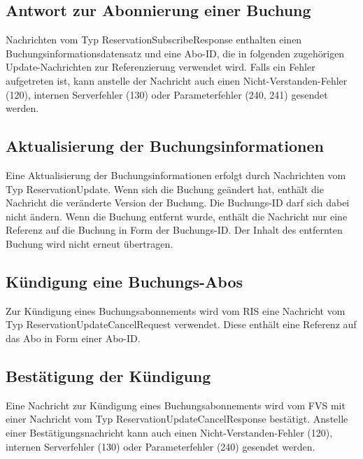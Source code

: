 

\subsection{Antwort zur Abonnierung einer Buchung}
Nachrichten vom Typ ReservationSubscribeResponse enthalten einen Buchungsinformationsdatensatz und eine Abo-ID, die in folgenden zugehörigen Update-Nachrichten zur Referenzierung verwendet wird. Falls ein Fehler aufgetreten ist, kann anstelle der Nachricht auch einen Nicht-Verstanden-Fehler (120), internen Serverfehler (130) oder Parameterfehler (240, 241) gesendet werden.



\subsection{Aktualisierung der Buchungsinformationen}
Eine Aktualisierung der Buchungsinformationen erfolgt durch Nachrichten vom Typ ReservationUpdate. Wenn sich die Buchung geändert hat, enthält die Nachricht die veränderte Version der Buchung. Die Buchungs-ID darf sich dabei nicht ändern. Wenn die Buchung entfernt wurde, enthält die Nachricht nur eine Referenz auf die Buchung in Form der Buchungs-ID. Der Inhalt des entfernten Buchung wird nicht erneut übertragen.



\subsection{Kündigung eine Buchungs-Abos}
Zur Kündigung eines Buchungsabonnements wird vom RIS eine Nachricht vom Typ ReservationUpdateCancelRequest verwendet. Diese enthält eine Referenz auf das Abo in Form einer Abo-ID.



\subsection{Bestätigung der Kündigung}
Eine Nachricht zur Kündigung eines Buchungsabonnements wird vom FVS mit einer Nachricht vom Typ ReservationUpdateCancelResponse bestätigt. Anstelle einer Bestätigungsnachricht kann auch einen Nicht-Verstanden-Fehler (120), internen Serverfehler (130) oder Parameterfehler (240) gesendet werden.

